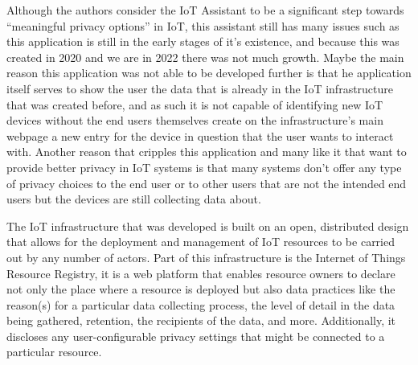 \documentclass[conference]{IEEEtran}
\begin{document}
Although the authors consider the IoT Assistant to be a significant step towards
``meaningful privacy options'' in IoT, this assistant still has many issues such as
this application is still in the early stages of it's existence, and because this was
created in 2020 and we are in 2022 there was not much growth. Maybe the main reason
this application was not able to be developed further is that he application itself
serves to show the user the data that is already in the IoT infrastructure that was created before,
and as such it is not capable of identifying new IoT devices without the end users themselves
create on the infrastructure's main webpage \cite{DasPersonalized} a new entry for the device in question that the
user wants to interact with. Another reason that cripples this application and many like
it that want to provide better privacy in IoT systems is that many systems don't
offer any type of privacy choices to the end user or to other users that are not
the intended end users but the devices are still collecting data about.

The IoT infrastructure that was developed \cite{DasPersonalized} is built on an open, distributed design
that allows for the deployment and management of IoT resources to be carried out
by any number of actors. Part of this infrastructure is the Internet of Things Resource Registry,
it is a web platform that enables resource owners to declare not only the place where a
resource is deployed but also data practices like the reason(s) for a particular data collecting
process, the level of detail in the data being gathered, retention, the recipients of the data,
and more. Additionally, it discloses any user-configurable privacy settings that might be
connected to a particular resource.
\end{document}
